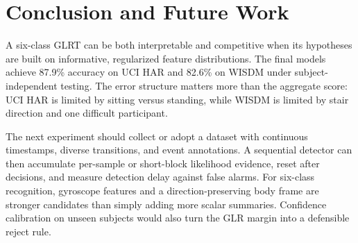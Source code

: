\documentclass[a4paper,conference,10pt]{IEEEtran}
\begin{document}
\section{Conclusion and Future Work}
A six-class GLRT can be both interpretable and competitive when its hypotheses are built on informative, regularized feature distributions. The final models achieve 87.9\% accuracy on UCI HAR and 82.6\% on WISDM under subject-independent testing. The error structure matters more than the aggregate score: UCI HAR is limited by sitting versus standing, while WISDM is limited by stair direction and one difficult participant.

The next experiment should collect or adopt a dataset with continuous timestamps, diverse transitions, and event annotations. A sequential detector can then accumulate per-sample or short-block likelihood evidence, reset after decisions, and measure detection delay against false alarms. For six-class recognition, gyroscope features and a direction-preserving body frame are stronger candidates than simply adding more scalar summaries. Confidence calibration on unseen subjects would also turn the GLR margin into a defensible reject rule.
\end{document}
